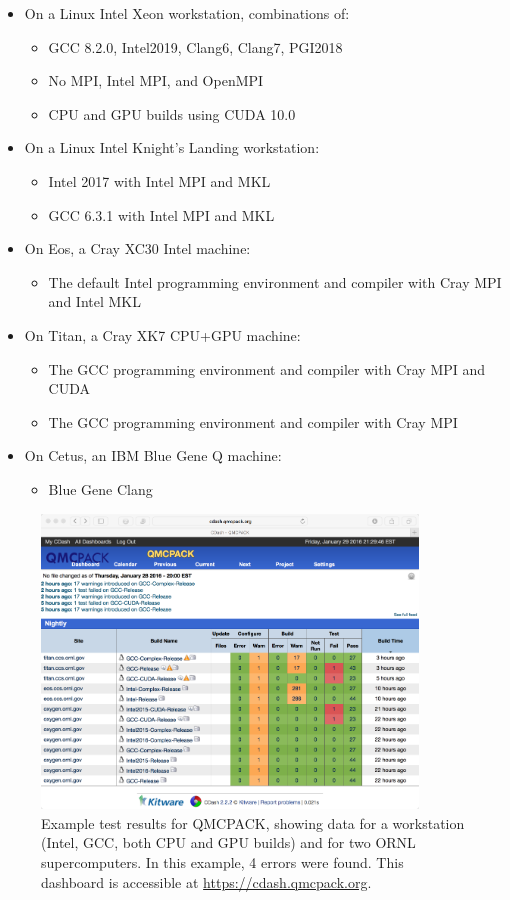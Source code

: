\begin{itemize}
\item On a Linux Intel Xeon workstation, combinations of:
  \begin{itemize}
  \item GCC 8.2.0, Intel2019, Clang6, Clang7, PGI2018
  \item No MPI, Intel MPI, and OpenMPI
  \item CPU and GPU builds using CUDA 10.0
  \end{itemize}
\item On a Linux Intel Knight's Landing workstation:
  \begin{itemize}
  \item Intel 2017 with Intel MPI and MKL
  \item GCC 6.3.1 with Intel MPI and MKL
  \end{itemize}
\item On Eos, a Cray XC30 Intel machine:
  \begin{itemize}
\item The default Intel programming environment and compiler with Cray MPI and Intel MKL
  \end{itemize}
\item On Titan, a Cray XK7 CPU+GPU machine:
  \begin{itemize}
  \item The GCC programming environment and compiler with Cray MPI and CUDA
  \item The GCC programming environment and compiler with Cray MPI
  \end{itemize}
\item On Cetus, an IBM Blue Gene Q machine:
\begin{itemize}
\item Blue Gene Clang
\end{itemize}
\end{itemize}

\begin{figure}
  \centering
  \includegraphics[width=10cm]{./figures/QMCPACK_CDash_CTest_Results_20160129.png}
  \caption{Example test results for QMCPACK, showing data for a
    workstation (Intel, GCC, both CPU and GPU builds) and for two ORNL
    supercomputers. In this example, 4 errors were found. This
    dashboard is accessible at \url{https://cdash.qmcpack.org}.}
\end{figure}

